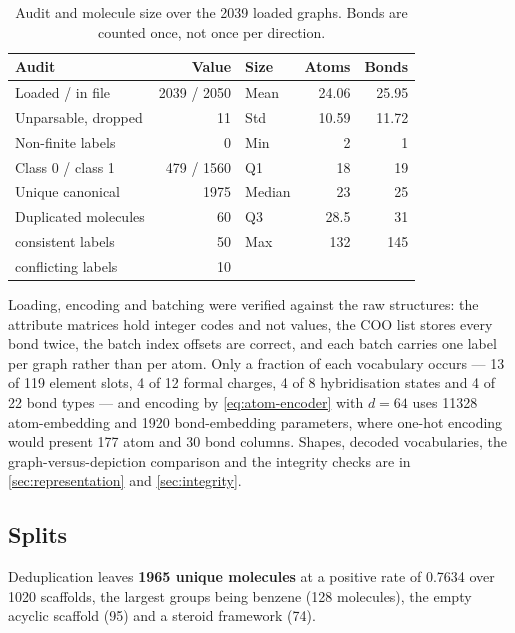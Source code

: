 \begin{table}[htb]
    \centering
    \caption{Audit and molecule size over the 2039 loaded graphs. Bonds are counted once, not once per direction.}
    \label{tab:audit}
    \footnotesize
    \setlength{\tabcolsep}{3pt}
    \begin{tabular}{@{}lr@{\hspace{0.5em}}lrr@{}}
        \toprule
        Audit & Value & Size & Atoms & Bonds \\
        \midrule
        Loaded / in file      & 2039 / 2050 & Mean   & 24.06 & 25.95 \\
        Unparsable, dropped   & 11         & Std    & 10.59 & 11.72 \\
        Non-finite labels     & 0          & Min    & 2     & 1     \\
        Class 0 / class 1     & 479 / 1560 & Q1     & 18    & 19    \\
        Unique canonical      & 1975       & Median & 23    & 25    \\
        Duplicated molecules  & 60         & Q3     & 28.5  & 31    \\
        \quad consistent labels & 50       & Max    & 132   & 145   \\
        \quad conflicting labels & 10      &        &       &       \\
        \bottomrule
    \end{tabular}
\end{table}
Loading, encoding and batching were verified against the raw structures: the attribute matrices hold integer codes and not values, the COO list stores every bond twice, the batch index offsets are correct, and each batch carries one label per graph rather than per atom. Only a fraction of each vocabulary occurs --- 13 of 119 element slots, 4 of 12 formal charges, 4 of 8 hybridisation states and 4 of 22 bond types --- and encoding by \cref{eq:atom-encoder} with $d=64$ uses \num{11328} atom-embedding and \num{1920} bond-embedding parameters, where one-hot encoding would present 177 atom and 30 bond columns. Shapes, decoded vocabularies, the graph-versus-depiction comparison and the integrity checks are in \ref{sec:representation} and \ref{sec:integrity}.

\subsection{Splits}
\label{sec:res-splits}

Deduplication leaves \textbf{1965 unique molecules} at a positive rate of 0.7634 over 1020 scaffolds, the largest groups being benzene (128 molecules), the empty acyclic scaffold (95) and a steroid framework (74).


